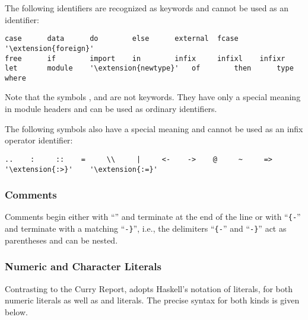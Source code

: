 The following identifiers are recognized as keywords
and cannot be used as an identifier:
\begin{lstlisting}[escapechar=']
case      data      do        else      external  fcase     '\extension{foreign}'
free      if        import    in        infix     infixl    infixr
let       module    '\extension{newtype}'   of        then      type      where
\end{lstlisting}

Note that the symbols , 
and  are not keywords.
They have only a special meaning in module headers
and can be used as ordinary identifiers.

The following symbols also have a special meaning and cannot
be used as an infix operator identifier:
\begin{lstlisting}[escapechar=']
..    :     ::    =     \\     |     <-    ->    @     ~     =>    '\extension{:>}'    '\extension{:=}'
\end{lstlisting}

\subsubsection{Comments}

Comments begin either with ``\term{--}'' and terminate at the end of the line
or with ``\verb|{-|'' and terminate with a matching ``\verb|-}|'', i.e.,
the delimiters ``\verb|{-|'' and ``\verb|-}|''
act as parentheses and can be nested.

\subsubsection{Numeric and Character Literals}

Contrasting to the Curry Report, \CYS adopts Haskell's notation of literals,
for both numeric literals as well as  and  literals.
The precise syntax for both kinds is given below.

